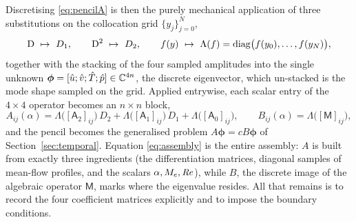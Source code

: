 \documentclass[11pt]{article}
\begin{document}
Discretising \eqref{eq:pencilA} is then the purely mechanical application of three substitutions on
the collocation grid $\{y_j\}_{j=0}^{N}$,
\begin{equation}\label{eq:subs}
  \D\ \mapsto\ D_1,\qquad \D^2\ \mapsto\ D_2,\qquad
  f(y)\ \mapsto\ \Lambda(f)=\operatorname{diag}\!\big(f(y_0),\dots,f(y_N)\big),
\end{equation}
together with the stacking of the four sampled amplitudes into the single unknown
$\boldsymbol\phi=[\hat{u};\hat{v};\hat{T};\hat{p}]\in\mathbb C^{4n}$, the discrete eigenvector, which
un-stacked is the mode shape sampled on the grid. Applied entrywise, each scalar entry of the
$4\times4$ operator becomes an $n\times n$ block,
\begin{equation}\label{eq:assembly}
  A_{ij}(\alpha)=\Lambda\big([\mathsf A_2]_{ij}\big)\,D_2+\Lambda\big([\mathsf A_1]_{ij}\big)\,D_1
  +\Lambda\big([\mathsf A_0]_{ij}\big),\qquad
  B_{ij}(\alpha)=\Lambda\big([\mathsf M]_{ij}\big),
\end{equation}
and the pencil becomes the generalised problem $A\boldsymbol\phi=cB\boldsymbol\phi$ of
Section~\ref{sec:temporal}. Equation \eqref{eq:assembly} is the entire assembly: $A$ is built from
exactly three ingredients (the differentiation matrices, diagonal samples of mean-flow profiles,
and the scalars $\alpha,M_e,\mathit{Re}$), while $B$, the discrete image of the algebraic operator
$\mathsf M$, marks where the eigenvalue resides. All that remains is to record the four coefficient
matrices explicitly and to impose the boundary conditions.
\end{document}
